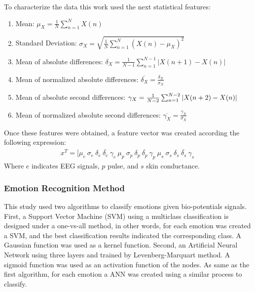 \documentclass{sig-alternate}
\begin{document}
To characterize the data this work used the next statistical features:
\begin{enumerate}
\item Mean:  $\mu_{X} = \frac{1}{N}\sum^{N}_{n=1} X(n)$
\item Standard Deviation:  $\sigma_{X} = \sqrt{ \frac{1}{N}\sum^{N}_{n=1} (X(n)-\mu_{X})^{2} }$
\item Mean of absolute differences:  $\delta_{X} = \frac{1}{N-1} \sum^{N-1}_{n=1}|X(n+1)-X(n)|$
\item Mean of normalized absolute differences: $\overline{\delta_{X}} = \frac{\delta_{X}}{\sigma_{X}}$
\item Mean of absolute second differences:  $\gamma_{X} = \frac{1}{N-2} \\
 \sum^{N-2}_{n=1}|X(n+2)-X(n)|$
\item Mean of normalized absolute second differences: $\overline{\gamma_{X}} = \frac{\gamma_{X}}{\sigma_{X}}$
\end{enumerate}  

Once these features were obtained, a feature vector was created according the following 
expression:
\begin{equation}
\begin{split}
x^{T} = [\mu_{e}\ \sigma_{e}\ \delta_{e}\ \overline{\delta_{e}}\ \gamma_{e}\ %
\mu_{p}\ \sigma_{p}\ \delta_{p}\ \overline{\delta_{p}}\ \gamma_{p}\ %
\mu_{s}\ \sigma_{s}\ \delta_{s}\ \overline{\delta_{s}}\ \gamma_{s}\ %
\end{split}
\end{equation}
Where $e$ indicates EEG signals, $p$ pulse, and $s$ skin conductance.

\subsubsection{Emotion Recognition Method}

This study used two algorithms to classify emotions given bio-potentials signals.
First, a Support Vector Machine (SVM) using a multiclass classification is designed under 
a one-vs-all method, in other words, for each emotion was created a SVM, and the best
classification results indicated the corresponding class. A Gaussian function was used as a kernel function.
Second, an Artificial Neural Network using three layers and trained by Levenberg-Marquart method.
A sigmoid function was used as an activation function of the nodes. As same as the first algorithm,
for each emotion a ANN was created using a similar process to classify.
\end{document}
